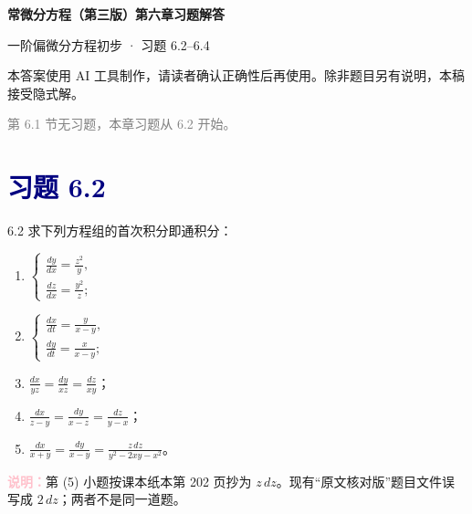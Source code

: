 \documentclass[UTF8,a4paper,11pt]{ctexart}
\newcommand{\note}[1]{\par\smallskip\noindent\textcolor{pink}{\bfseries 说明：}#1\par\smallskip}
\newcommand{\sect}[1]{\section*{\textcolor{navy}{习题 #1}}}
\begin{document}
\begin{center}
  {\LARGE\bfseries\color{navy}常微分方程（第三版）第六章习题解答\par}
  \vspace{0.35em}
  {\color{pink}一阶偏微分方程初步 · 习题 6.2--6.4\par}
\end{center}
\begin{center}
  \small\color{gray}本答案使用 AI 工具制作，请读者确认正确性后再使用。除非题目另有说明，本稿接受隐式解。
\end{center}
\noindent\textcolor{gray}{\small 第 6.1 节无习题，本章习题从 6.2 开始。}

\sect{6.2}
\begin{problem}{6.2}
求下列方程组的首次积分即通积分：
\begin{enumerate}[label=(\arabic*)]
\item $\begin{cases}
\displaystyle \frac{dy}{dx}=\frac{z^2}{y},\\[5pt]
\displaystyle \frac{dz}{dx}=\frac{y^2}{z};
\end{cases}$
\item $\begin{cases}
\displaystyle \frac{dx}{dt}=\frac{y}{x-y},\\[5pt]
\displaystyle \frac{dy}{dt}=\frac{x}{x-y};
\end{cases}$
\item $\displaystyle\frac{dx}{yz}=\frac{dy}{xz}=\frac{dz}{xy}$；
\item $\displaystyle\frac{dx}{z-y}=\frac{dy}{x-z}=\frac{dz}{y-x}$；
\item $\displaystyle\frac{dx}{x+y}
=\frac{dy}{x-y}
=\frac{z\,dz}{y^2-2xy-x^2}$。
\end{enumerate}
\note{第 (5) 小题按课本纸本第 202 页抄为 $z\,dz$。现有“原文核对版”题目文件误写成 $2\,dz$；两者不是同一道题。}
\end{problem}
\end{document}
